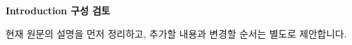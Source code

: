 \documentclass[11pt,a4paper]{article}
\begin{document}
{\Large\bfseries Introduction 구성 검토}\par
{\small 현재 원문의 설명을 먼저 정리하고, 추가할 내용과 변경할 순서는 별도로 제안합니다.}

\clearpage

\clearpage

\end{document}
